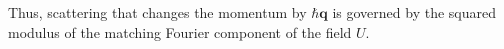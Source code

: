 Thus, scattering that changes the momentum by $\hbar\mathbf q$ is governed by the squared modulus of the matching Fourier component of the field $U$.
